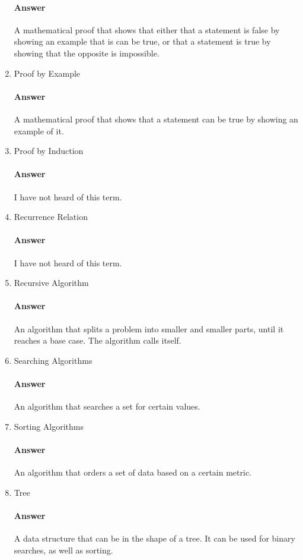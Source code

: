 \documentclass{article}
\begin{document}
\begin{enumerate}
	\paragraph{Answer} A mathematical proof that shows that either that a statement is false by showing an example that is can be true, or that a statement is true by showing that the opposite is impossible.
    \item Proof by Example
	\paragraph{Answer} A mathematical proof that shows that a statement can be true by showing an example of it.
    \item Proof by Induction
	\paragraph{Answer} I have not heard of this term.
    \item Recurrence Relation
	\paragraph{Answer} I have not heard of this term.
    \item Recursive Algorithm
	\paragraph{Answer} An algorithm that splits a problem into smaller and smaller parts, until it reaches a base case. The algorithm calls itself.
    \item Searching Algorithms
	\paragraph{Answer} An algorithm that searches a set for certain values.
    \item Sorting Algorithms
	\paragraph{Answer} An algorithm that orders a set of data based on a certain metric.
    \item Tree
	\paragraph{Answer} A data structure that can be in the shape of a tree. It can be used for binary searches, as well as sorting.
\end{enumerate}
\end{document}
